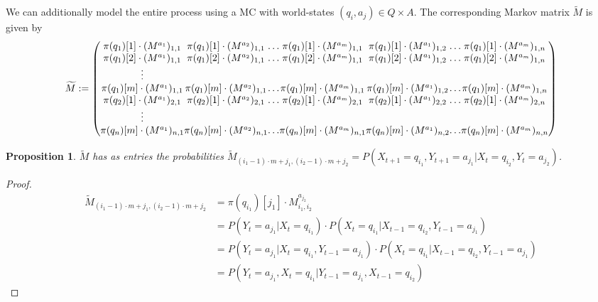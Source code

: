 \documentclass{article}
\newtheorem{prop}{Proposition}
\theoremstyle{definition}
\begin{document}
We can additionally model the entire process using a MC with world-states $(q_i,a_j) \in Q \times A$. The corresponding Markov matrix $\widetilde{M}$ is given by 
\label{MC:HMM2}
{\footnotesize
\[\setlength{\arraycolsep}{0pt} 
\widetilde{M}:=
\left ( 
\begin{matrix}
\pi(q_1)[1]\cdot (M^{a_1})_{1,1} & \pi(q_1)[1]\cdot (M^{a_2})_{1,1} & \ldots & \pi(q_1)[1]\cdot (M^{a_m})_{1,1} & \pi(q_1)[1]\cdot (M^{a_1})_{1,2} & \ldots & \pi(q_1)[1]\cdot (M^{a_m})_{1,n} \\
\pi(q_1)[2]\cdot (M^{a_1})_{1,1} & \pi(q_1)[2]\cdot (M^{a_2})_{1,1} & \ldots & \pi(q_1)[2]\cdot (M^{a_m})_{1,1} & \pi(q_1)[2]\cdot (M^{a_1})_{1,2} & \ldots &\pi(q_1)[2]\cdot (M^{a_m})_{1,n} \\
\vdots \\
\pi(q_1)[m]\cdot (M^{a_1})_{1,1} & \pi(q_1)[m]\cdot (M^{a_2})_{1,1} & \ldots & \pi(q_1)[m]\cdot (M^{a_m})_{1,1} & \pi(q_1)[m]\cdot (M^{a_1})_{1,2} & \ldots & \pi(q_1)[m]\cdot (M^{a_m})_{1,n} \\
\pi(q_2)[1]\cdot (M^{a_1})_{2,1} & \pi(q_2)[1]\cdot (M^{a_2})_{2,1} & \ldots & \pi(q_2)[1]\cdot (M^{a_m})_{2,1} & \pi(q_2)[1]\cdot (M^{a_1})_{2,2} & \ldots & \pi(q_2)[1]\cdot (M^{a_m})_{2,n} \\
\vdots \\ 
\pi(q_n)[m]\cdot (M^{a_1})_{n,1} & \pi(q_n)[m]\cdot (M^{a_2})_{n,1} & \ldots & \pi(q_n)[m]\cdot (M^{a_m})_{n,1} & \pi(q_n)[m]\cdot (M^{a_1})_{n,2} & \ldots & \pi(q_n)[m]\cdot (M^{a_m})_{n,n} \\
\end{matrix} 
\right )
\]
}
\begin{prop}
$\widetilde{M}$ has as entries the probabilities $\widetilde{M}_{(i_1-1) \cdot m+j_1,(i_2-1) \cdot m+j_2}=P(X_{t+1}=q_{i_1},Y_{t+1}=a_{j_1}|X_{t}=q_{i_2},Y_t=a_{j_2})$.
\end{prop}
\begin{proof}
\begin{align*}
\widetilde{M}_{(i_1-1)\cdot m+j_1,(i_2-1)\cdot m+j_2}&=\pi(q_{i_1})[j_1]\cdot M^{a_{j_2}}_{i_1,i_2}  \\
&=P(Y_{t}=a_{j_1}|X_{t}=q_{i_1})\cdot P(X_t=q_{i_1}|X_{t-1}=q_{i_2},Y_{t-1}=a_{j_1}) \\
&=P(Y_{t}=a_{j_1}|X_t=q_{i_1},Y_{t-1}=a_{j_1})\cdot P(X_t=q_{i_1}|X_{t-1}=q_{i_2},Y_{t-1}=a_{j_1}) \\
&=P(Y_{t}=a_{j_1},X_t=q_{i_1}|Y_{t-1}=a_{j_1},X_{t-1}=q_{i_2})
\end{align*}
\end{proof}
\end{document}
